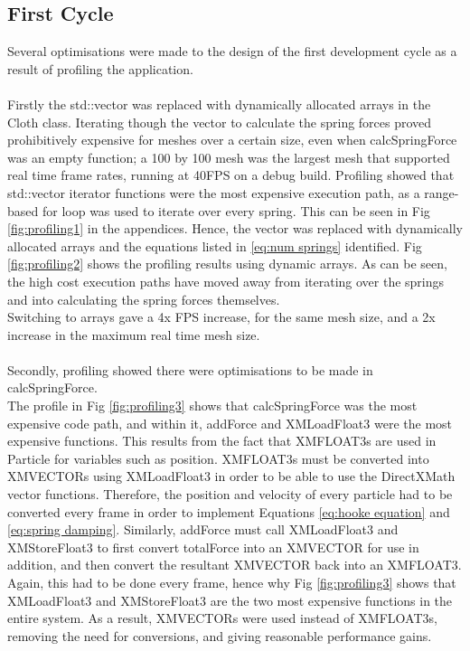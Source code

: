\subsection{First Cycle}
Several optimisations were made to the design of the first development cycle as a result of profiling the application.
\\\\Firstly the std::vector was replaced with dynamically allocated arrays in the Cloth class. Iterating though the vector to calculate the spring forces proved prohibitively expensive for meshes over a certain size, even when calcSpringForce was an empty function; a 100 by 100 mesh was the largest mesh that supported real time frame rates, running at 40FPS on a debug build. Profiling showed that std::vector iterator functions were the most expensive execution path, as a range-based for loop was used to iterate over every spring. This can be seen in Fig \ref{fig:profiling1} in the appendices. Hence, the vector was replaced with dynamically allocated arrays and the equations listed in \ref{eq:num springs} identified. Fig \ref{fig:profiling2} shows the profiling results using dynamic arrays. As can be seen, the high cost execution paths have moved away from iterating over the springs and into calculating the spring forces themselves.
\\Switching to arrays gave a 4x FPS increase, for the same mesh size, and a 2x increase in the maximum real time mesh size.
\\\\Secondly, profiling showed there were optimisations to be made in calcSpringForce.
\\The profile in Fig \ref{fig:profiling3} shows that calcSpringForce was the most expensive code path, and within it, addForce and XMLoadFloat3 were the most expensive functions. This results from the fact that XMFLOAT3s are used in Particle for variables such as position. XMFLOAT3s must be converted into XMVECTORs using XMLoadFloat3 in order to be able to use the DirectXMath vector functions. Therefore, the position and velocity of every particle had to be converted every frame in order to implement Equations \ref{eq:hooke equation} and \ref{eq:spring damping}. Similarly, addForce must call XMLoadFloat3 and XMStoreFloat3 to first convert totalForce into an XMVECTOR for use in addition, and then convert the resultant XMVECTOR back into an XMFLOAT3. Again, this had to be done every frame, hence why Fig \ref{fig:profiling3} shows that XMLoadFloat3 and XMStoreFloat3 are the two most expensive functions in the entire system. As a result, XMVECTORs were used instead of XMFLOAT3s, removing the need for conversions, and giving reasonable performance gains.
